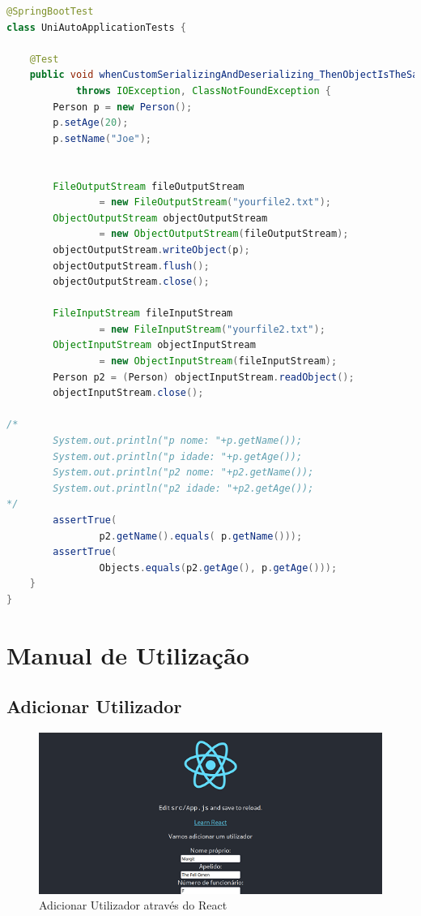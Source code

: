 \documentclass[11pt,a4paper]{report}%
\begin{document}
\begin{lstlisting}[language=Java, caption=Teste em java]
@SpringBootTest
class UniAutoApplicationTests {

    @Test
    public void whenCustomSerializingAndDeserializing_ThenObjectIsTheSame()
            throws IOException, ClassNotFoundException {
        Person p = new Person();
        p.setAge(20);
        p.setName("Joe");


        FileOutputStream fileOutputStream
                = new FileOutputStream("yourfile2.txt");
        ObjectOutputStream objectOutputStream
                = new ObjectOutputStream(fileOutputStream);
        objectOutputStream.writeObject(p);
        objectOutputStream.flush();
        objectOutputStream.close();

        FileInputStream fileInputStream
                = new FileInputStream("yourfile2.txt");
        ObjectInputStream objectInputStream
                = new ObjectInputStream(fileInputStream);
        Person p2 = (Person) objectInputStream.readObject();
        objectInputStream.close();

/*
        System.out.println("p nome: "+p.getName());
        System.out.println("p idade: "+p.getAge());
        System.out.println("p2 nome: "+p2.getName());
        System.out.println("p2 idade: "+p2.getAge());
*/
        assertTrue(
                p2.getName().equals( p.getName()));
        assertTrue(
                Objects.equals(p2.getAge(), p.getAge()));
    }
}
\end{lstlisting}
\newpage
\chapter{Manual de Utilização}
\section{Adicionar Utilizador}

\begin{figure}[h!]
\centering
\includegraphics[scale=1.0]{Pictures/reactToBD.png}
\caption{\label{fig:Diagrama} Adicionar Utilizador através do React}
\end{figure}
\end{document}
